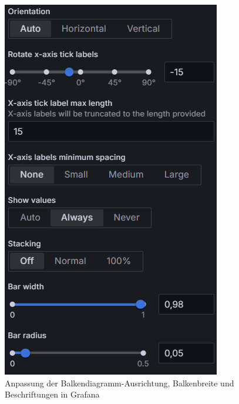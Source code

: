 \begin{figure}[H]
    \centering
    \begin{minipage}{0.49\textwidth}
        \centering
        \includegraphics[width=\linewidth, keepaspectratio]{images/orientation.png}
        \caption{Anpassung der Balkendiagramm-Ausrichtung, Balkenbreite und Beschriftungen in Grafana}
        \label{fig:orientation}
    \end{minipage}
    \hfill
    \begin{minipage}{0.49\textwidth}
        \centering

\end{minipage}
\end{figure}
